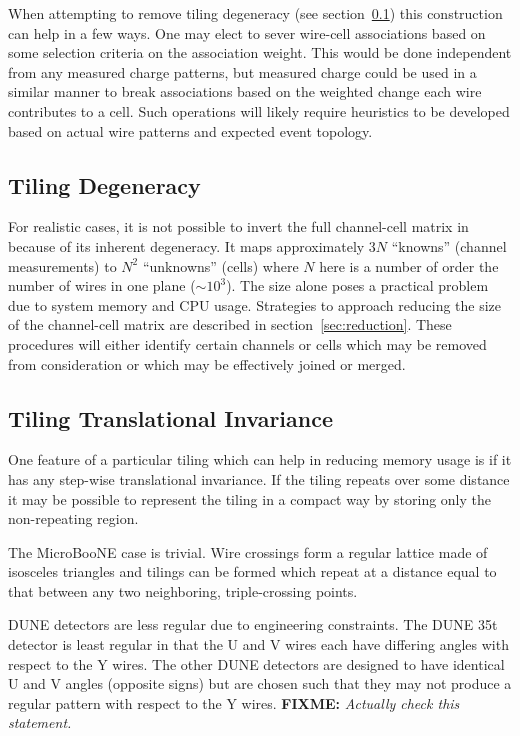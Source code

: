 \documentclass[letter]{article}
\newcommand\fixme[1]{\textbf{FIXME:} \textit{#1}\xspace}
\begin{document}
When attempting to remove tiling degeneracy (see
section~\ref{subsec:tilingdegeneracy}) this construction can help in a
few ways.
One may elect to sever wire-cell associations based on some selection
criteria on the association weight.
This would be done independent from any measured charge patterns, but
measured charge could be used in a similar manner to break
associations based on the weighted change each wire contributes to a cell.
Such operations will likely require heuristics to be developed based
on actual wire patterns and expected event topology.


\subsection{Tiling Degeneracy}
\label{subsec:tilingdegeneracy}

For realistic cases, it is not possible to invert the full
channel-cell matrix in because of its inherent degeneracy.
It maps approximately $3N$ ``knowns'' (channel measurements) to $N^2$
``unknowns'' (cells) where $N$ here is a number of order the number of
wires in one plane ($\sim 10^3$).
The size alone poses a practical problem due to system memory and CPU
usage.
Strategies to approach reducing the size of the channel-cell matrix
are described in section~\ref{sec:reduction}.
These procedures will either identify certain channels or cells which
may be removed from consideration or which may be effectively joined
or merged.

\subsection{Tiling Translational Invariance}

One feature of a particular tiling which can help in reducing memory
usage is if it has any step-wise translational invariance.
If the tiling repeats over some distance it may be possible to
represent the tiling in a compact way by storing only the
non-repeating region.

The MicroBooNE case is trivial.
Wire crossings form a regular lattice made of isosceles triangles and
tilings can be formed which repeat at a distance equal to that between
any two neighboring, triple-crossing points.

DUNE detectors are less regular due to engineering constraints.
The DUNE 35t detector is least regular in that the U and V wires each have
differing angles with respect to the Y wires.
The other DUNE detectors are designed to have identical U and V angles
(opposite signs)
but are chosen such that they may not produce a regular pattern with
respect to the Y wires.
\fixme{Actually check this statement.}
\end{document}
